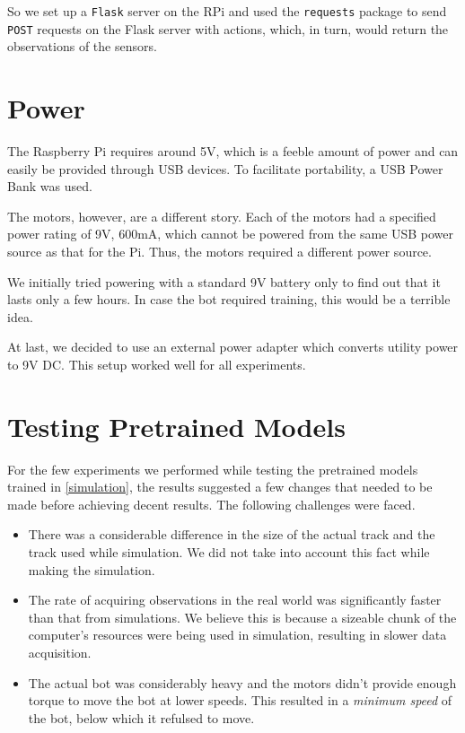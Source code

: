 \documentclass[12pt]{extreport}
\theoremstyle{plain}
\theoremstyle{definition}
\begin{document}
So we set up a \texttt{Flask} server on the RPi and used the \texttt{requests} package to send \texttt{POST} requests on the Flask server with actions, which, in turn, would return the observations of the sensors.

\section{Power}

The Raspberry Pi requires around 5V, which is a feeble amount of power and can easily be provided through USB devices. To facilitate portability, a USB Power Bank was used.

The motors, however, are a different story. Each of the motors had a specified power rating of 9V, 600mA, which cannot be powered from the same USB power source as that for the Pi. Thus, the motors required a different power source.

We initially tried powering with a standard 9V battery only to find out that it lasts only a few hours. In case the bot required training, this would be a terrible idea.

At last, we decided to use an external power adapter which converts utility power to 9V DC. This setup worked well for all experiments.

\section{Testing Pretrained Models} \label{testing-pretrained-models}
For the few experiments we performed while testing the pretrained models trained in \autoref{simulation}, the results suggested a few changes that needed to be made before achieving decent results. The following challenges were faced.

\begin{itemize}
 \item There was a considerable difference in the size of the actual track and the track used while simulation. We did not take into account this fact while making the simulation.
 \item The rate of acquiring observations in the real world was significantly faster than that from simulations. We believe this is because a sizeable chunk of the computer's resources were being used in simulation, resulting in slower data acquisition.
 \item The actual bot was considerably heavy and the motors didn't provide enough torque to move the bot at lower speeds. This resulted in a \emph{minimum speed} of the bot, below which it refulsed to move.
\end{itemize}
\end{document}
